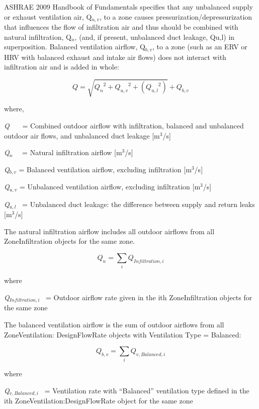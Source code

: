 ASHRAE 2009 Handbook of Fundamentals specifies that any unbalanced supply or exhaust ventilation air, Q\(_{u,v}\), to a zone causes pressurization/depressurization that influences the flow of infiltration air and thus should be combined with natural infiltration, Q\(_{n}\), (and, if present, unbalanced duct leakage, Qu,l) in superposition. Balanced ventilation airflow, Q\(_{b,v}\), to a zone (such as an ERV or HRV with balanced exhaust and intake air flows) does not interact with infiltration air and is added in whole:

\begin{equation}
Q = \sqrt {{Q_n}^2 + {Q_{u,v}}^2 + ({Q_{u,l}}^2)}  + {Q_{b,v}}
\end{equation}

where,

\emph{Q}~~~ = Combined outdoor airflow with infiltration, balanced and unbalanced outdoor air flows, and unbalanced duct leakage {[}m\(^{3}\)/s{]}

\emph{Q\(_{n}\)}~~ = Natural infiltration airflow {[}m\(^{3}\)/s{]}

\emph{Q\(_{b,v}\)} = Balanced ventilation airflow, excluding infiltration {[}m\(^{3}\)/s{]}

\emph{Q\(_{u,v}\)} = Unbalanced ventilation airflow, excluding infiltration {[}m\(^{3}\)/s{]}

\emph{Q\(_{u,l}\)}~ = Unbalanced duct leakage: the difference between supply and return leaks {[}m\(^{3}\)/s{]}

The natural infiltration airflow includes all outdoor airflows from all ZoneInfiltration objects for the same zone.

\begin{equation}
{Q_n} = \sum\limits_i {{Q_{Infiltration,i}}}
\end{equation}

where

\emph{Q\(_{Infiltration,i}\)}~ = Outdoor airflow rate given in the ith ZoneInfiltration objects for the same zone

The balanced ventilation airflow is the sum of outdoor airflows from all ZoneVentilation: DesignFlowRate objects with Ventilation Type = Balanced:

\begin{equation}
{Q_{b,v}} = \sum\limits_i {{Q_{v,Balanced,i}}}
\end{equation}

where

\emph{Q\(_{v,Balanced,i}\)}~ = Ventilation rate with ``Balanced'' ventilation type defined in the ith ZoneVentilation:DesignFlowRate object for the same zone

